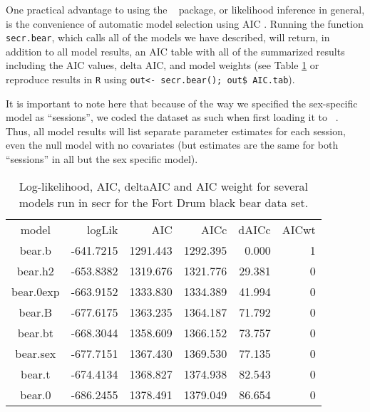 One practical advantage to using the \secr~ package, or likelihood
inference in general, is the convenience of automatic model selection
using AIC \citep{burnham_anderson:2002}.
Running the function {\tt secr.bear}, which calls all of the models we
have described, will return, in addition to all model results, 
an AIC table with all of the summarized results including the AIC values,
delta AIC, and model weights (see Table \ref{covariates.tab.secrAIC}
or reproduce results in {\tt R} using {\tt out<- secr.bear(); out\$ AIC.tab}). 

It is important to note here that because of the way we specified the
sex-specific model as ``sessions'', we coded the dataset as such when
first loading it to \secr~.  Thus, all model results will list
separate parameter estimates for each session, even the null model
with no covariates (but estimates are the same for both ``sessions''
in all but the sex specific model). 


\begin{table}[ht]
\centering
\caption{Log-likelihood, AIC, deltaAIC and AIC weight for several models run in secr for the Fort Drum black bear data set.}
\begin{tabular}{crrrrr}
\hline
model     &  logLik   &   AIC    &   AICc   & dAICc  & AICwt \\
bear.b    & -641.7215 & 1291.443 & 1292.395 & 0.000  &  1 \\
bear.h2   & -653.8382 & 1319.676 & 1321.776 & 29.381 &  0 \\
bear.0exp & -663.9152 & 1333.830 & 1334.389 & 41.994 &  0 \\
bear.B    & -677.6175 & 1363.235 & 1364.187 & 71.792 &  0 \\
bear.bt   & -668.3044 & 1358.609 & 1366.152 & 73.757 &  0 \\
bear.sex  & -677.7151 & 1367.430 & 1369.530 & 77.135 &  0 \\
bear.t    & -674.4134 & 1368.827 & 1374.938 & 82.543 &  0 \\
bear.0    & -686.2455 & 1378.491 & 1379.049 & 86.654 &  0 \\
\end{tabular}
\label{covariates.tab.secrAIC}
\end{table}


